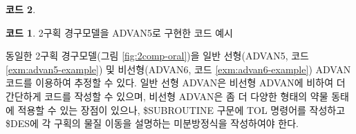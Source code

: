 \documentclass[
  10pt,
  krantz2,
  a4paper]{krantz}
\newenvironment{Shaded}{\begin{snugshade}}{\end{snugshade}}
\newcommand{\DecValTok}[1]{\textcolor[rgb]{0.00,0.00,0.81}{#1}}
\newcommand{\KeywordTok}[1]{\textcolor[rgb]{0.13,0.29,0.53}{\textbf{#1}}}
\newcommand{\NormalTok}[1]{#1}
\newcommand{\OperatorTok}[1]{\textcolor[rgb]{0.81,0.36,0.00}{\textbf{#1}}}
\newcommand{\StringTok}[1]{\textcolor[rgb]{0.31,0.60,0.02}{#1}}
\theoremstyle{definition}
\theoremstyle{definition}
\newtheorem{example}{코드}[chapter]
\theoremstyle{definition}
\theoremstyle{remark}
\begin{document}
\begin{Shaded}
\end{Shaded}

\begin{example}
\begin{example}

\protect\hypertarget{exm:advan5-example}{}{\label{exm:advan5-example} }2구획 경구모델을 ADVAN5로 구현한 코드 예시

\end{example}
\end{example}

동일한 2구획 경구모델(그림 \ref{fig:2comp-oral})을 일반 선형(ADVAN5, 코드 \ref{exm:advan5-example}) 및 비선형(ADVAN6, 코드 \ref{exm:advan6-example}) ADVAN 코드를 이용하여 추정할 수 있다. 일반 선형 ADVAN은 비선형 ADVAN에 비하여 더 간단하게 코드를 작성할 수 있으며, 비선형 ADVAN은 좀 더 다양한 형태의 약물 동태에 적용할 수 있는 장점이 있으나, \$SUBROUTINE 구문에 TOL 명령어를 작성하고 \$DES에 각 구획의 물질 이동을 설명하는 미분방정식을 작성하여야 한다.
\end{document}
